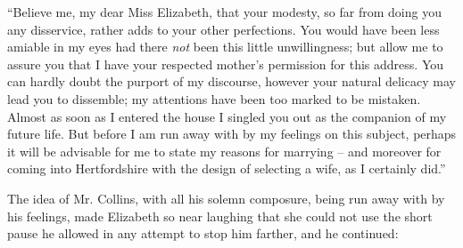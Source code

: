 “Believe me, my dear Miss Elizabeth, that your
modesty, so far from doing you any disservice, rather
adds to your other perfections. You would have been
less amiable in my eyes had there \textit{not} been this little
unwillingness; but allow me to assure you that I have
your respected mother’s permission for this address.
You can hardly doubt the purport of my discourse,
however your natural delicacy may lead you to dissemble;
my attentions have been too marked to be mistaken.
Almost as soon as I entered the house I singled you out
as the companion of my future life. But before I am run
away with by my feelings on this subject, perhaps it will
be advisable for me to state my reasons for marrying -- and
moreover for coming into Hertfordshire with the
design of selecting a wife, as I certainly did.”

The idea of Mr. Collins, with all his solemn composure,
being run away with by his feelings, made Elizabeth so
near laughing that she could not use the short pause he
allowed in any attempt to stop him farther, and he
continued:

